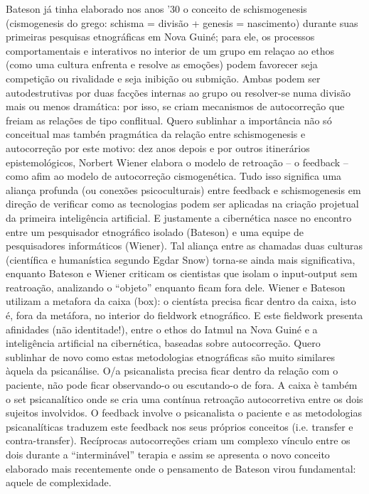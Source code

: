 \documentclass[a4paper, 11pt]{article} %
\begin{document}
Bateson já tinha elaborado nos anos  ’30 o conceito de schismogenesis (cismogenesis do grego: schisma = divisão +  genesis = nascimento) durante suas primeiras pesquisas etnográficas em Nova Guiné; para ele,  os processos comportamentais e interativos no interior de um grupo em relaçao ao ethos (como uma cultura enfrenta e resolve as emoções) podem favorecer seja competição ou rivalidade e seja inibição ou submição. Ambas  podem ser autodestrutivas por duas facções internas ao grupo ou resolver-se numa divisão mais ou menos dramática: por isso, se criam mecanismos de autocorreção que freiam as relações de tipo conflitual. Quero sublinhar a importância não só conceitual mas tambén pragmática da relação entre schismogenesis e autocorreção por este motivo: dez anos depois e por outros itinerários epistemológicos, Norbert Wiener elabora o modelo de retroação – o feedback – como afim ao modelo de autocorreção cismogenética. Tudo isso significa uma aliança profunda (ou conexões psicoculturais) entre feedback e schismogenesis em direção de verificar como as tecnologias podem ser aplicadas na criação projetual da primeira inteligência artificial. E justamente a cibernética nasce no encontro entre um pesquisador etnográfico isolado (Bateson) e uma equipe de pesquisadores informáticos (Wiener). Tal aliança entre as chamadas duas culturas (científica e humanística segundo Egdar Snow) torna-se ainda mais significativa, enquanto Bateson e Wiener criticam os cientistas que isolam o input-output sem reatroação, analizando o “objeto” enquanto ficam fora dele. Wiener e Bateson utilizam a metafora da caixa (box): o cientísta precisa ficar dentro da caixa, isto é, fora da metáfora, no interior do fieldwork etnográfico. E este fieldwork presenta afinidades (não identitade!), entre o ethos do Iatmul na Nova Guiné e  a inteligência artificial na cibernética, baseadas sobre autocorreção. Quero sublinhar de novo como estas metodologias etnográficas  são muito similares àquela da psicanálise. O/a psicanalista precisa ficar dentro da relação com o paciente, não pode ficar observando-o ou escutando-o de fora. A caixa è também o set psicanalítico onde se cria uma contínua retroação autocorretiva entre os dois sujeitos involvidos. O feedback involve o psicanalista o paciente e as metodologias psicanalíticas traduzem este feedback nos seus próprios conceitos (i.e. transfer e contra-transfer). Recíprocas autocorreções criam um complexo vínculo entre os dois durante a “interminável” terapia e assim se apresenta o novo conceito elaborado mais recentemente onde o pensamento de Bateson virou fundamental: aquele de complexidade.
\end{document}

